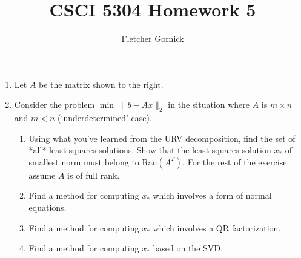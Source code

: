 \documentclass[11pt]{article}
\title{\vspace{-1.0cm}CSCI 5304 Homework 5}
\author{Fletcher Gornick}
\begin{document}
\maketitle
\begin{enumerate}
	\item Let \(A\) be the matrix shown to the right.

	\item Consider the problem \(\min \; \lVert b - Ax \rVert_2\) in the situation where \(A\) is \(m \times n\) and \(m < n\) (`underdetermined' case).
	      \begin{enumerate}
		      \item Using what you've learned from the URV decomposition, find the set of *all* least-squares solutions.  Show that the least-squares solution \(x_*\) of smallest norm must belong to Ran\((A^T)\).  For the rest of the exercise assume \(A\) is of full rank.
		      \item Find a method for computing \(x_*\) which involves a form of normal equations.
		      \item Find a method for computing \(x_*\) which involves a QR factorization.
		      \item Find a method for computing \(x_*\) based on the SVD.
	      \end{enumerate}


\end{enumerate}
\end{document}
